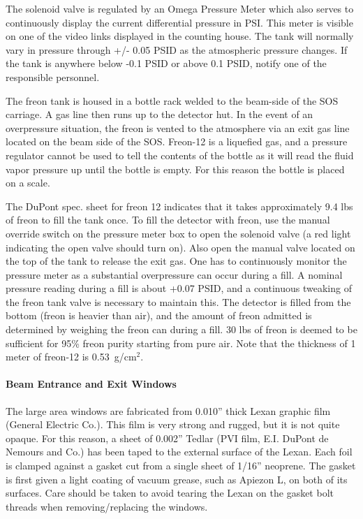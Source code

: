 \begin{obsolete}
The solenoid valve is regulated by an Omega Pressure Meter which also
serves to continuously display the current differential pressure in
PSI. This meter is visible on one of the video links displayed in the
counting house.  The tank will normally vary in pressure through +/-
0.05 PSID as the atmospheric pressure changes.  If the tank is
anywhere below -0.1 PSID or above 0.1 PSID, notify one of the
responsible personnel.

	The freon tank is housed in a bottle rack welded to the
beam-side of the SOS carriage.  A gas line then runs up to the detector
hut.  In the event of an overpressure situation, the freon is vented to
the atmosphere via an exit gas line located on the beam side of the SOS.
Freon-12 is a liquefied gas, and a pressure
regulator cannot be used to tell the contents of the bottle as it will
read the fluid vapor pressure up until the bottle is empty. For this
reason the bottle is placed on a scale.

	The DuPont spec. sheet for freon 12 indicates that it takes
approximately 9.4 lbs of freon to fill the tank once.  To fill the
detector with freon, use the manual override switch on the pressure
meter box to open the solenoid valve (a red light indicating the open
valve should turn on).  Also open the manual valve located on the top
of the tank to release the exit gas.  One has to continuously monitor
the pressure meter as a substantial overpressure can occur during a
fill.  A nominal pressure reading during a fill is about +0.07 PSID,
and a continuous tweaking of the freon tank valve is necessary to
maintain this.  The detector is filled from the bottom (freon is
heavier than air), and the
amount of freon admitted is determined by weighing the freon can
during a fill.  30 lbs of freon is deemed to be sufficient for 95\%
freon purity starting from pure air.
Note that the thickness of 1 meter of freon-12 is 0.53~g/cm$^{2}$.

\paragraph{Beam Entrance and Exit Windows}

	The large area windows are fabricated from 0.010'' thick Lexan
graphic film (General Electric Co.).  This film is very strong and
rugged, but it is not quite opaque.  For this reason, a sheet of
0.002'' Tedlar (PVI film, E.I. DuPont de Nemours and Co.) has been
taped to the external surface of the Lexan.  Each foil is clamped
against a gasket cut from a single sheet of 1/16'' neoprene.  The
gasket is first given a light coating of vacuum grease, such as
Apiezon L, on both of its surfaces.  Care should be taken to avoid
tearing the Lexan on the gasket bolt threads when removing/replacing the
windows.


\end{obsolete}

